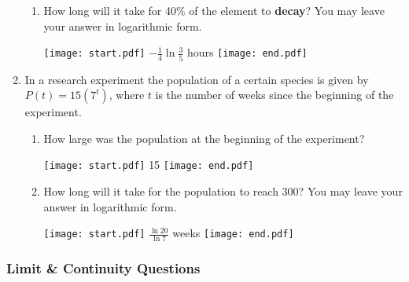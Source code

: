 \documentclass[12pt]{article}
\begin{document}
\begin{enumerate}
\begin{enumerate}
\item  How long will it take for 40\% of the element to {\bf decay}?  You may leave your answer in logarithmic form.

\texttt{[image: start.pdf]}
{$\displaystyle -\frac{1}{4}\ln{\frac{3}{5}}$ hours}
\texttt{[image: end.pdf]}


\end{enumerate}

\item In a research experiment the population of a certain species is given by $P(t)=15(7^t)$, where $t$ is the number of weeks since the beginning of the experiment.

\begin{enumerate}

\item How large was the population at the beginning of the experiment?

\texttt{[image: start.pdf]}
{15}
\texttt{[image: end.pdf]}


\item How long will it take for the population to reach 300?  You may leave your answer in logarithmic form.

\texttt{[image: start.pdf]}
{$\displaystyle \frac{\ln{20}}{\ln{7}}$ weeks}
\texttt{[image: end.pdf]}


\end{enumerate}

\end{enumerate}

\subsubsection*{Limit \& Continuity Questions}

\end{document}
